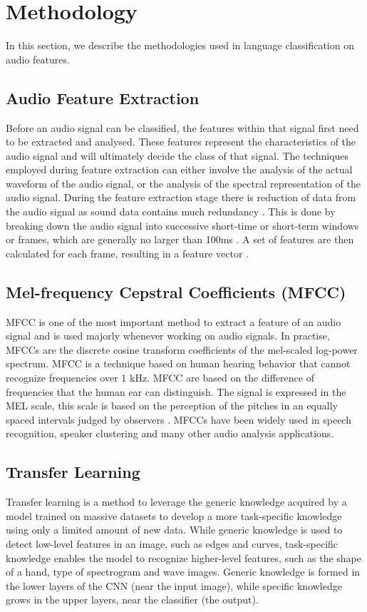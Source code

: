 \documentclass[conference]{IEEEtran}
\begin{document}
\section{Methodology}\label{Sec:Methodology} 

In this section, we describe the methodologies used in language classification on audio features.

\subsection{Audio Feature Extraction}\label{SubSec:AudioFeature}
Before an audio signal can be classified, the features within that signal first need to be extracted and analysed. These features represent the characteristics of the audio signal and will ultimately decide the class of that signal. The techniques employed during feature extraction can either involve the analysis of the actual waveform of the audio signal, or the analysis of the spectral representation of the audio signal. During the feature extraction stage there is reduction of data from the audio signal as sound data contains much redundancy \cite{b3}. This is done by breaking down the audio signal into successive short-time or short-term windows or frames, which are generally no larger than 100ms \cite{b6}. A set of features are then calculated for each frame, resulting in a feature vector \cite{b12}.

\subsection{Mel-frequency Cepstral Coefficients (MFCC)}\label{SubSec:MFCC}
MFCC is one of the most important method to extract a feature of an audio signal and is used majorly whenever working on audio signals. In practise, MFCCs are the discrete cosine transform coefficients of the mel-scaled log-power spectrum. MFCC is a technique based on human hearing behavior that cannot recognize frequencies  over 1 kHz. MFCC are based on the difference of frequencies that the human ear can distinguish. The signal is expressed in the MEL scale, this scale is based on the perception of the pitches in an equally spaced intervals judged by observers \cite{b7}. MFCCs have been widely used in speech recognition, speaker clustering and many other audio analysis applications.

\subsection{Transfer Learning}\label{SubSec:TransferLearning}
Transfer learning is a method to leverage the generic knowledge acquired by a model trained on massive datasets to develop a more task-specific knowledge using only a limited amount of new data. While generic knowledge is used to detect low-level features in an image, such as edges and curves, task-specific knowledge enables the model to recognize higher-level features, such as the shape of a hand, type of spectrogram and wave images. Generic knowledge is formed in the lower layers of the CNN (near the input image), while specific knowledge grows in the upper layers, near the classifier (the output)\cite{b14}.
	 
\end{document}
